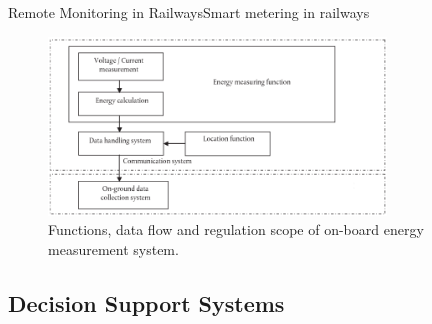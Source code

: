 \begin{frame}{Remote Monitoring in Railways}{Smart metering in railways}

\begin{figure}[h!]
	\centering
		\includegraphics[width=0.8\textwidth,keepaspectratio]{figures/34.SmartM/EMS}
	\caption{Functions, data flow and regulation scope of on-board energy measurement system.}
\end{figure}

\end{frame}

\subsection{Decision Support Systems}


